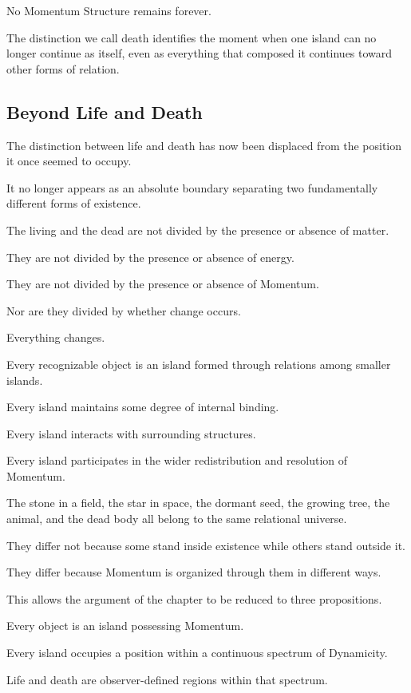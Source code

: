 No Momentum Structure remains forever.

The distinction we call death identifies the moment when one island can no longer continue as itself, even as everything that composed it continues toward other forms of relation.

\subsection*{\textbf{Beyond Life and Death}} 

The distinction between life and death has now been displaced from the position it once seemed to occupy.

It no longer appears as an absolute boundary separating two fundamentally different forms of existence.

The living and the dead are not divided by the presence or absence of matter.

They are not divided by the presence or absence of energy.

They are not divided by the presence or absence of Momentum.

Nor are they divided by whether change occurs.

Everything changes.

Every recognizable object is an island formed through relations among smaller islands.

Every island maintains some degree of internal binding.

Every island interacts with surrounding structures.

Every island participates in the wider redistribution and resolution of Momentum.

The stone in a field, the star in space, the dormant seed, the growing tree, the animal, and the dead body all belong to the same relational universe.

They differ not because some stand inside existence while others stand outside it.

They differ because Momentum is organized through them in different ways.

This allows the argument of the chapter to be reduced to three propositions.

Every object is an island possessing Momentum.

Every island occupies a position within a continuous spectrum of Dynamicity.

Life and death are observer-defined regions within that spectrum.

